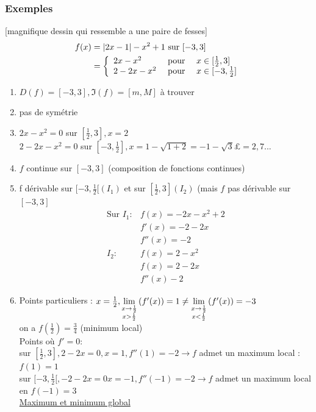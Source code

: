 \documentclass[12pt,a4paper]{article}
\begin{document}
{\subsubsection{Exemples}
[magnifique dessin qui ressemble a une paire de fesses]
\begin{align*}
f(x) &= |2x-1|-x^2+1\text{ sur }[-3,3]\\
	 &=\left\{
	 		\begin{array}{lll}
				2x-x^2 & \mbox{ pour } & x \in [\frac{1}{2},3]\\
				2-2x -x^2 & \mbox{ pour } & x\in [-3,\frac{1}{2}]
			\end{array}
		\right.	
\end{align*}
\begin{enumerate}
	\item  $D(f) = [-3,3], \Im(f) = [m,M]$ à trouver
	\item pas de symétrie
	\item $2x-x^2 = 0$ sur $[\frac{1}{2}, 3], x = 2$\\
	$2-2x-x^2 = 0$ sur $[-3,\frac{1}{2}], x = 1-\sqrt{1+2} = -1-\sqrt{3} £= 2,7...$
	\item $f$ continue sur $[-3,3]$ (composition de fonctions continues)
	\item f dérivable sur $[-3,\frac{1}{2}[ (I_1)$ et sur $[\frac{1}{2},3](I_2)$ (mais $f$ pas dérivable sur $[-3,3]$\\
	\begin{align*}
		\text{Sur } I_1 : & f(x) = -2x-x^2+2\\
		& f'(x) = -2-2x\\
		&f''(x) = -2\\
		I_2 : & f(x) = 2-x^2\\
		& f(x) = 2-2x\\
		& f''(x) -2
	\end{align*}
	\item Points particuliers : $x = \frac{1}{2}, \lim\limits_{\substack{x\to\frac{1}{2} \\ x > \frac{1}{2}}}\left(f'(x)\right) = 1 \neq \lim\limits_{\substack{x\to\frac{1}{2} \\ x<\frac{1}{2}}}\left(f'(x)\right) = -3$\\
	on a $f(\frac{1}{2}) = \frac{3}{4}$ (minimum local)\\
	Points où $f' = 0$:\\
	 sur $[\frac{1}{2},3], 2-2x = 0, x = 1, f''(1) = -2 \to f$ admet un maximum local : $f(1) = 1$\\
	 sur $[-3,\frac{1}{2}[, -2-2x = 0 x = -1, f''(-1) = -2 \to f$ admet un maximum local en $f(-1) = 3$\\
	 \underline{Maximum et minimum global}\\

\end{enumerate}}
\end{document}

